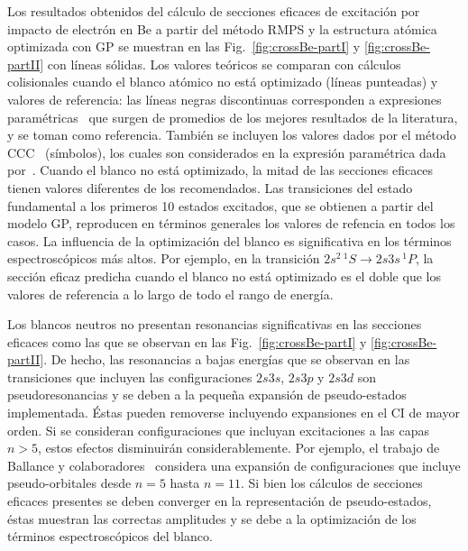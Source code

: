 Los resultados obtenidos del cálculo de secciones eficaces de excitación 
por impacto de electrón en Be a partir del método RMPS y la estructura 
atómica optimizada con GP se muestran en las 
Fig.~\ref{fig:crossBe-partI} y \ref{fig:crossBe-partII} con líneas 
sólidas. Los valores teóricos se comparan con cálculos colisionales 
cuando el blanco atómico no está optimizado (líneas punteadas) y valores
de referencia: las líneas negras discontinuas corresponden a expresiones
paramétricas~\cite{Dipti:19} que surgen de promedios de los mejores 
resultados de la literatura, y se toman como referencia. También se 
incluyen los valores dados por el método CCC~\cite{Fursa:97} (símbolos), 
los cuales son considerados en la expresión paramétrica 
dada por~\cite{Dipti:19}. Cuando el blanco no está optimizado, la mitad 
de las secciones eficaces tienen valores diferentes de los recomendados. 
Las transiciones del estado fundamental a los primeros 10 estados 
excitados, que se obtienen a partir del modelo GP, reproducen en 
términos generales los valores de refencia en todos los casos. La 
influencia de la optimización del blanco es significativa en los 
términos espectroscópicos más altos. Por ejemplo, en la transición 
$2s^2\,^1S\rightarrow 2s3s\,^1P$, la sección eficaz predicha cuando el 
blanco no está optimizado es el doble que los valores de referencia a lo 
largo de todo el rango de energía. 

Los blancos neutros no presentan resonancias significativas en las 
secciones eficaces como las que se observan en las 
Fig.~\ref{fig:crossBe-partI} y \ref{fig:crossBe-partII}. De hecho, las 
resonancias a bajas energías que se observan en las transiciones que 
incluyen las configuraciones $2s3s$, $2s3p$ y $2s3d$ son 
pseudoresonancias y se deben a la pequeña expansión de pseudo-estados
implementada. Éstas pueden removerse incluyendo expansiones en el CI
de mayor orden. Si se consideran configuraciones que incluyan 
excitaciones a las capas $n>5$, estos efectos disminuirán 
considerablemente. Por ejemplo, el trabajo de Ballance y 
colaboradores~\cite{Be_Ballance:03} considera una expansión de 
configuraciones que incluye pseudo-orbitales desde $n=5$ hasta $n=11$.
Si bien los cálculos de secciones eficaces presentes se deben converger 
en la representación de pseudo-estados, éstas muestran las correctas 
amplitudes y se debe a la optimización de los términos espectroscópicos 
del blanco. 

